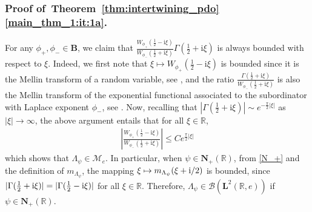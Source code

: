 \documentclass[12pt]{amsart}
\numberwithin{equation}{section}
\newcommand{\bb}{\mathbb}
\renewcommand{\le}{\leqslant}
\newcommand{\bmrm}[2][2]{\mathbf{#2}^{#1}}
\newcommand{\Wphip}{W_{\phi_+}\left(\frac{1}{2}-\i\xi\right)}
\newcommand{\Wphim}{W_{\phi_-}\left(\frac{1}{2}+\i\xi\right)}
\newcommand{\B}{\mathbf{B}}
\renewcommand{\i}{\mathrm{i}}
\newcommand{\LRe}{\bmrm{L}(\bb{R},e)}
\newcommand{\NN}{\mathbf{N}}
\theoremstyle{definition}
\theoremstyle{assump}
\theoremstyle{remark}
\begin{document}
{\subsubsection{Proof of~Theorem~\ref{thm:intertwining_pdo}\eqref{main_thm_1:it:1a}.} For any $\phi_+,\phi_-\in\B$, we claim that $\frac{\Wphip}{\Wphim}\Gamma(\frac{1}{2}+\i\xi)$ is always bounded with respect to $\xi$. Indeed, we first note that $\xi\mapsto\Wphip$ is bounded since it is the Mellin transform of a random variable, see \cite[Theorem~6.1(3)]{patiesavov}, and the ratio $\frac{\Gamma(\frac{1}{2}+\i\xi)}{\Wphim}$ is also the Mellin transform of the exponential functional associated to the subordinator with Laplace exponent $\phi_-$, see \cite[Theorem~2.2]{hirsch_yor}. Now, recalling  that $|\Gamma(\frac{1}{2}+\i\xi)|\sim e^{-\frac{\pi}{2}|\xi|}$ as $|\xi|\to\infty$, the above argument entails that for all $\xi\in\bb R$,
\begin{align*}
	\left|\frac{\Wphip}{\Wphim}\right|\le Ce^{\frac{\pi}{2}|\xi|}
\end{align*}
which shows that $\Lambda_\psi\in\mathscr{M}_e$. In particular, when $\psi\in\NN_+(\bb R)$, from \eqref{N_+} and the definition of $m_{\Lambda_\psi}$, the mapping $\xi\mapsto m_{\Lambda_\psi}(\xi+{\rm{i}}/2)$ is bounded, since $|\Gamma({1 \over 2}+\i\xi)|=|\Gamma({1\over 2}-\i\xi)|$ for all $\xi\in\bb R$.
 Therefore, $\Lambda_\psi\in\mathscr{B}(\LRe)$ if $\psi\in\NN_+(\bb R)$.

}
\end{document}
